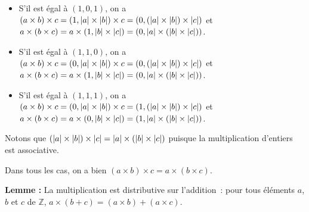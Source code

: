 \begin{itemize}[nosep]
\begin{itemize}[nosep]
                \item S'il est égal à $(1,0,1)$, on a 
                    $(a \times b) \times c = (1,\left\lvert a \right\rvert \times \left\lvert b \right\rvert) \times c = (0, (\left\lvert a \right\rvert \times \left\lvert b \right\rvert) \times \left\lvert c \right\rvert)$ et 
                    $a \times (b \times c) = a \times (1, \left\lvert b \right\rvert \times \left\lvert c \right\rvert) = (0, \left\lvert a \right\rvert \times (\left\lvert b \right\rvert \times \left\lvert c \right\rvert))$.
                \item S'il est égal à $(1,1,0)$, on a 
                    $(a \times b) \times c = (0,\left\lvert a \right\rvert \times \left\lvert b \right\rvert) \times c = (0, (\left\lvert a \right\rvert \times \left\lvert b \right\rvert) \times \left\lvert c \right\rvert)$ et 
                    $a \times (b \times c) = a \times (1, \left\lvert b \right\rvert \times \left\lvert c \right\rvert) = (0, \left\lvert a \right\rvert \times (\left\lvert b \right\rvert \times \left\lvert c \right\rvert))$.
                \item S'il est égal à $(1,1,1)$, on a 
                    $(a \times b) \times c = (0,\left\lvert a \right\rvert \times \left\lvert b \right\rvert) \times c = (1, (\left\lvert a \right\rvert \times \left\lvert b \right\rvert) \times \left\lvert c \right\rvert)$ et 
                    $a \times (b \times c) = a \times (0, \left\lvert b \right\rvert \times \left\lvert c \right\rvert) = (1, \left\lvert a \right\rvert \times (\left\lvert b \right\rvert \times \left\lvert c \right\rvert))$.
            \end{itemize}
            Notons que $(\left\lvert a \right\rvert \times \left\lvert b \right\rvert) \times \left\lvert c \right\rvert = \left\lvert a \right\rvert \times (\left\lvert b \right\rvert \times \left\lvert c \right\rvert)$ puisque la multiplication d'entiers est associative.
    \end{itemize}
    Dans tous les cas, on a bien $(a \times b) \times c = a \times (b \times c)$.

   \done 

\medskip

\noindent\textbf{Lemme :} La multiplication est distributive sur l'addition : pour tous éléments $a$, $b$ et $c$ de $\mathbb{Z}$, $a \times (b + c) = (a \times b) + (a \times c)$.

\medskip

